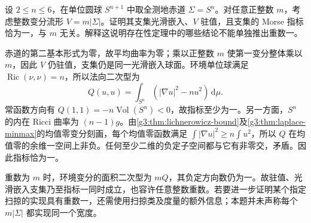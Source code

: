\begin{optionalexercise}\label{g3:ex:equator-index-multiplicity}
	设 \(2\le n\le6\)，在单位圆球 \(S^{n+1}\) 中取全测地赤道 \(\Sigma=S^n\)。对任意正整数 \(m\)，考虑整数变分流形 \(V=m|\Sigma|\)。证明其支集光滑嵌入、\(V\) 驻值，且支集的 Morse 指标恰为一，与 \(m\) 无关。解释这说明存在性定理中的哪些结论不能单独推出重数一。
\end{optionalexercise}
\begin{solution}
	赤道的第二基本形式为零，故平均曲率为零；乘以正整数 \(m\) 使第一变分整体乘以 \(m\)，因此 \(V\) 仍驻值，支集仍是同一光滑嵌入球面。环境单位球满足 \(\operatorname{Ric}(\nu,\nu)=n\)，所以法向二次型为
	\[
		Q(u,u)=\int_{S^n}(|\nabla u|^2-nu^2)\,\mathrm d\mu.
	\]
	常函数方向有 \(Q(1,1)=-n\operatorname{Vol}(S^n)<0\)，故指标至少为一。另一方面，\(S^n\) 的内在 Ricci 曲率为 \((n-1)g\)。由\cref{g3:thm:lichnerowicz-bound}及\cref{g3:thm:laplace-minmax}的均值零变分刻画，每个均值零函数满足 \(\int|\nabla u|^2\ge n\int u^2\)，所以 \(Q\) 在均值零的余维一空间上非负。任何至少二维的负定子空间都与它有非零交，矛盾。因此指标恰为一。

	重数为 \(m\) 时，环境变分的面积二次型为 \(mQ\)，其负定方向数仍为一。故驻值、光滑嵌入支集乃至指标一同时成立，也容许任意整数重数。若要进一步证明某个指定扫掠的实现具有重数一，还需使用扫掠类及度量的额外信息；本题并未声称每个 \(m|\Sigma|\) 都实现同一个宽度。
\end{solution}
